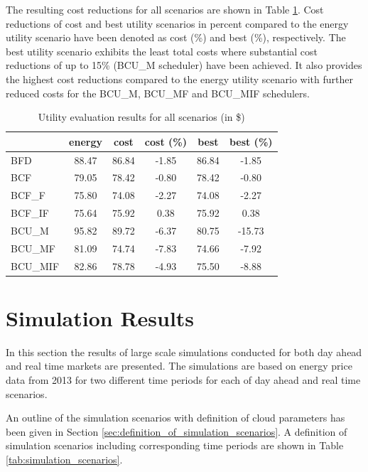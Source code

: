 The resulting cost reductions for all scenarios are shown in Table \ref{tab:utility_evaluation_results}. 
Cost reductions of cost and best utility scenarios in percent compared to the energy utility scenario have been denoted as cost (\%) and best (\%), respectively. 
The best utility scenario exhibits the least total costs where substantial cost reductions of up to 15\% (BCU\_M scheduler) have been achieved. It also provides the highest cost reductions compared to the energy utility scenario with further reduced costs for the BCU\_M, BCU\_MF and BCU\_MIF schedulers. 


\begin{table}[htbp]
\centering
\begin{tabular}{lccccc}
\toprule
{} &  energy &   cost &  cost (\%) &   best &  best (\%) \\
\midrule
BFD     &   88.47 &  86.84 &     -1.85 &  86.84 &     -1.85 \\
BCF     &   79.05 &  78.42 &     -0.80 &  78.42 &     -0.80 \\
BCF\_F   &   75.80 &  74.08 &     -2.27 &  74.08 &     -2.27 \\
BCF\_IF  &   75.64 &  75.92 &      0.38 &  75.92 &      0.38 \\
BCU\_M   &   95.82 &  89.72 &     -6.37 &  80.75 &    -15.73 \\
BCU\_MF  &   81.09 &  74.74 &     -7.83 &  74.66 &     -7.92 \\
BCU\_MIF &   82.86 &  78.78 &     -4.93 &  75.50 &     -8.88 \\
\bottomrule
\end{tabular}
\caption{Utility evaluation results for all scenarios (in \$)}
\label{tab:utility_evaluation_results}
\end{table}







\section{Simulation Results} \label{sec:simulation_results}

In this section the results of large scale simulations conducted for both day ahead and real time markets are presented. The simulations are based on energy price data from 2013 for two different time periods for each of day ahead and real time scenarios. 

An outline of the simulation scenarios with definition of cloud parameters has been given in Section \ref{sec:definition_of_simulation_scenarios}. 
A definition of simulation scenarios including corresponding time periods are shown in Table \ref{tab:simulation_scenarios}. 

